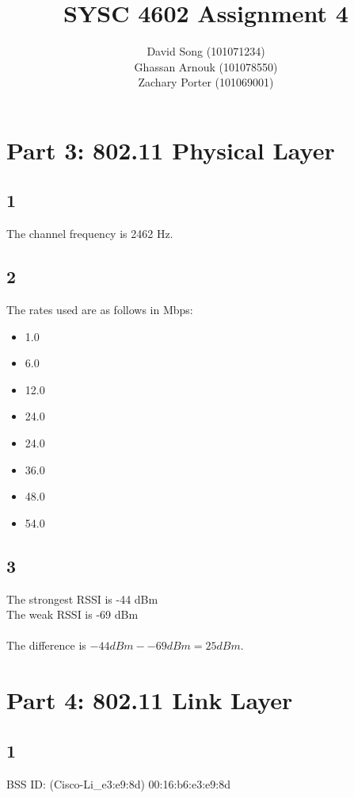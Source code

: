 \documentclass{article}
\begin{document}
    \title  { \textbf{SYSC 4602 Assignment 4} }
    \author {
        David Song (101071234)\\
        Ghassan Arnouk (101078550)\\
        Zachary Porter (101069001)
    }
     
    \maketitle
    
    \clearpage
    \section*{Part 3: 802.11 Physical Layer}
    \subsection*{1}
    The channel frequency is 2462 Hz.
    \subsection*{2}
    The rates used are as follows in Mbps:
    \begin{itemize}
        \item 1.0
        \item 6.0
        \item 12.0
        \item 24.0
        \item 24.0
        \item 36.0
        \item 48.0
        \item 54.0
    \end{itemize}
    \subsection*{3}
    The strongest RSSI is -44 dBm \\
    The weak RSSI is -69 dBm \\
    \\
    The difference is $-44 dBm - -69 dBm = 25 dBm$. \\

    \section*{Part 4: 802.11 Link Layer}
    \subsection*{1}
    BSS ID: (Cisco-Li\_e3:e9:8d) 00:16:b6:e3:e9:8d
\end{document}
